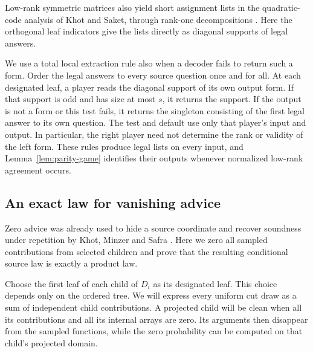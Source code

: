Low-rank symmetric matrices also yield short assignment lists in the
quadratic-code analysis of Khot and Saket, through rank-one decompositions
\cite[Lemma~2.1 and Section~7.2, ECCC version]{KhotSaket2017}.
Here the orthogonal leaf indicators give the lists directly as diagonal
supports of legal answers.

We use a total local extraction rule also when a decoder fails to
return such a form.  Order the legal answers to every source question
once and for all.  At each designated leaf, a player reads the
diagonal support of its own output form.  If that support is odd and
has size at most $s$, it returns the support.  If the output is not a
form or this test fails, it returns the singleton consisting of the
first legal answer to its own question.  The test and default use
only that player's input and output.  In particular, the right
player need not determine the rank or validity of the left form.
These rules produce legal lists on every input, and Lemma~\ref{lem:parity-game}
identifies their outputs whenever normalized low-rank agreement occurs.

\subsection{An exact law for vanishing advice}

Zero advice was already used to hide a source coordinate and recover
soundness under repetition by Khot, Minzer and Safra
\cite[Sections~3.3--3.4, especially Remark~3.2]{KhotMinzerSafra2017}.
Here we zero all sampled contributions from selected children and prove
that the resulting conditional source law is exactly a product law.

Choose the first leaf of each child of $D_i$ as its designated leaf.
This choice depends only on the ordered tree.  We will express every
uniform cut draw as a sum of independent child contributions.  A projected
child will be clean when all its contributions and all its internal arrays
are zero.  Its arguments then disappear from the sampled functions, while
the zero probability can be computed on that child's projected domain.

